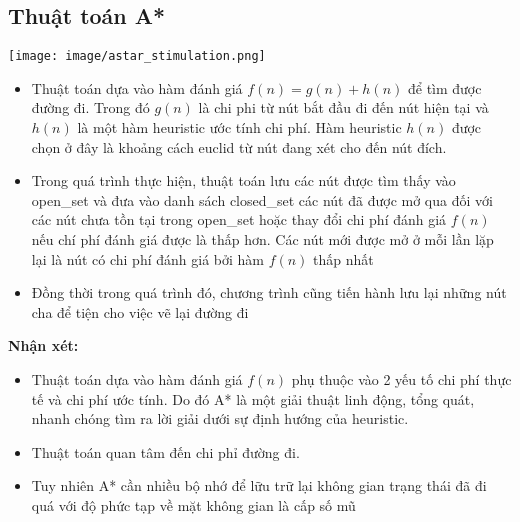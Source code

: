 \documentclass{article}
\begin{document}
\subsection{Thuật toán A*}
    \centerline{\texttt{[image: image/astar\_stimulation.png]}}
    \vspace{2\baselineskip}
    \begin{itemize}
        \item Thuật toán dựa vào hàm đánh giá $f(n) = g(n) + h(n)$ để tìm được đường đi. Trong đó $g(n)$ là chi phi từ nút bắt đầu đi đến nút hiện tại và $h(n)$ là một hàm heuristic ước tính chi phí. Hàm heuristic $h(n)$ được chọn ở đây là khoảng cách euclid từ nút đang xét cho đến nút đích. 
        \item Trong quá trình thực hiện, thuật toán lưu các nút được tìm thấy vào open\_set và đưa vào danh sách closed\_set các nút đã được mở qua đối với các nút chưa tồn tại trong open\_set hoặc thay đổi chi phí đánh giá $f(n)$ nếu chí phí đánh giá được là thấp hơn. Các nút mới được mở ở mỗi lần lặp lại là nút có chi phí đánh giá bởi hàm $f(n)$ thấp nhất
        \item Đồng thời trong quá trình đó, chương trình cũng tiến hành lưu lại những nút cha để tiện cho việc vẽ lại đường đi
    \end{itemize}
    \textbf{Nhận xét: }
    \begin{itemize}
        \item Thuật toán dựa vào hàm đánh giá $f(n)$ phụ thuộc vào 2 yếu tố chi phí thực tế và chi phí ước tính. Do đó A* là một giải thuật linh động, tổng quát, nhanh chóng tìm ra lời giải dưới sự định hướng của heuristic. 
        \item Thuật toán quan tâm đến chi phỉ đường đi.
        \item Tuy nhiên A* cần nhiều bộ nhớ để lữu trữ lại không gian trạng thái đã đi quá với độ phức tạp về mặt không gian là cấp số mũ
    \end{itemize}
\end{document}
